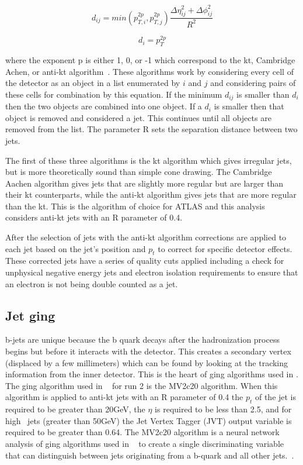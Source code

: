 \begin{equation}
\label{EQ-OBJ-ANTIKT}
d_{ij} = min(p^{2p}_{T,i},p^{2p}_{T,j})\frac{\Delta\eta^{2}_{ij}+\Delta\phi^{2}_{ij}}{R^{2}}
\end{equation}

\begin{equation}
\label{EQ-OBJ-ANTIKTBEAM}
d_{i} = p^{2p}_{T}
\end{equation}

where the exponent p is either 1, 0, or -1 which correspond to the kt, Cambridge Achen, or anti-kt algorithm~\cite{AntiKt}. These algorithms work by considering every cell of the detector as an object in a list enumerated by $i$ and $j$ and considering pairs of these cells for combination by this equation. If the minimum $d_{ij}$ is smaller than $d_i$ then the two objects are combined into one object. If a $d_i$ is smaller then that object is removed and considered a jet. This continues until all objects are removed from the list. The parameter R sets the separation distance between two jets.  

The first of these three algorithms is the kt algorithm which gives irregular jets, but is more theoretically sound than simple cone drawing. The Cambridge Aachen algorithm gives jets that are slightly more regular but are larger than their kt counterparts, while the anti-kt algorithm gives jets that are more regular than the kt. This is the algorithm of choice for ATLAS and this analysis considers anti-kt jets with an R parameter of 0.4. 

After the selection of jets with the anti-kt algorithm corrections are applied to each jet based on the jet's position and $p_t$ to correct for specific detector effects. These corrected jets have a series of quality cuts applied including a check for unphysical negative energy jets and electron isolation requirements to ensure that an electron is not being double counted as a jet. 


\subsection{Jet \btag ging}
\label{SECTION-OBJ-JET-BTAG}

b-jets are unique because the b quark decays after the hadronization process begins but before it interacts with the detector. This creates a secondary vertex (displaced by a few millimeters) which can be found by looking at the tracking information from the inner detector. This is the heart of \btag ging algorithms used in \atlas. The \btag ging algorithm used in \atlas~ for run 2 is the MV2c20 algorithm. When this algorithm is applied to anti-kt jets with an R parameter of 0.4 the $p_t$ of the jet is required to be greater than 20GeV, the $\eta$ is required to be less than 2.5, and for high \PT~jets (greater than 50GeV) the Jet Vertex Tagger (JVT) output variable is required to be greater than 0.64. The MV2c20 algorithm is a neural network analysis of \btag ging algorithms used in \atlas~ to create a single discriminating variable that can distinguish between jets originating from a b-quark and all other jets.~\cite{ATL-PHYS-PUB-2015-022}. 



